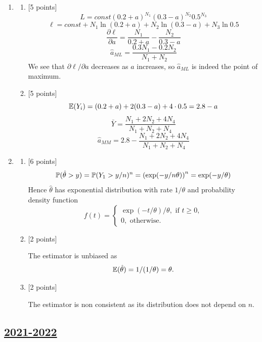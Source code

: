\begin{enumerate}
\begin{enumerate}
\[    \Corr(u_t, u_{t-1}) = 0.    
    \]
    \[
    u_t^2 = 3 + 0.5 u_{t-1}^2 + (u_t^2 - \sigma_t^2)    
    \]
    We notice that $r_t = u_t^2 - \sigma_t^2$ is a white noise, hence $u_t^2$ is an $AR(1)$ process.
    Hence, $\Corr(u_t^2, u_{t-1}^2) = 0.5$.
\end{enumerate}
\item 
\begin{enumerate}
    \item {[5 points]}
    \[
    L = const (0.2 + a)^{N_1} (0.3 - a)^{N_2} 0.5^{N_3}    
    \]
    \[
    \ell = const + N_1 \ln (0.2 +a) + N_2\ln(0.3 - a) + N_3 \ln 0.5    
    \]
    \[
    \frac{\partial \ell}{\partial a} = \frac{N_1}{0.2 + a} - \frac{N_2}{0.3 - a} 
    \]
    \[
    \hat{a}_{ML} = \frac{0.3 N_1 - 0.2 N_2}{N_1 + N_2}    
    \]
    We see that $\partial \ell /\partial a$ decreases as $a$ increases, so 
    $\hat{a}_{ML}$ is indeed the point of maximum. 
    \item {[5 points]}
    \[
    \E(Y_i) = (0.2 + a) + 2(0.3 - a) + 4\cdot 0.5 = 2.8 -a    
    \]
    \[
    \bar Y = \frac{N_1 + 2N_2  + 4N_4}{N_1 + N_2  + N_4}    
    \]
    \[
    \hat a_{MM} = 2.8 - \frac{N_1 + 2N_2  + 4N_4}{N_1 + N_2  + N_4}
    \]
\end{enumerate}
\item 
\begin{enumerate}
    \item {[6 points]}
    \[
    \P(\hat \theta > y) = \P(Y_1 > y/n)^n = \left( \exp(-y/n\theta) \right)^n = \exp(-y/\theta)
    \]
    Hence $\hat\theta$ has exponential distribution with rate $1/\theta$ and 
    probability density function
    \[
    f(t) = \begin{cases}
        \exp(-t/\theta)/\theta, \text{ if } t\geq 0, \\
        0, \text{ otherwise}.
    \end{cases}
    \]
    \item {[2 points]}
    
    The estimator is unbiased as
    \[
    \E(\hat\theta) = 1/(1/\theta) = \theta.    
    \]
    \item {[2 points]}
    
    The estimator is non consistent as its distribution does not depend on $n$.
\end{enumerate}

\end{enumerate}



\subsection[2021-2022]{\hyperref[sec:kr_03_2021_2022]{2021-2022}}
\label{sec:sol_kr_03_2021_2022} %



